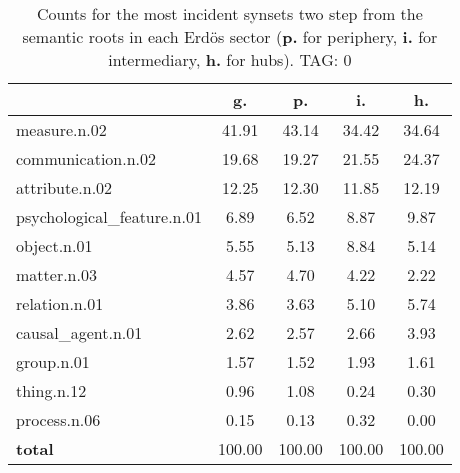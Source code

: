 \begin{table}[h!]
\begin{center}
\begin{tabular}{| l || c | c | c | c |}\hline
 & {\bf g.} & {\bf p.} & {\bf i.} & {\bf h.} \\\hline\hline
measure.n.02 & 41.91  & 43.14  & 34.42  & 34.64 \\\hline
communication.n.02 & 19.68  & 19.27  & 21.55  & 24.37 \\\hline
attribute.n.02 & 12.25  & 12.30  & 11.85  & 12.19 \\\hline
psychological\_feature.n.01 & 6.89  & 6.52  & 8.87  & 9.87 \\\hline
object.n.01 & 5.55  & 5.13  & 8.84  & 5.14 \\\hline
matter.n.03 & 4.57  & 4.70  & 4.22  & 2.22 \\\hline
relation.n.01 & 3.86  & 3.63  & 5.10  & 5.74 \\\hline
causal\_agent.n.01 & 2.62  & 2.57  & 2.66  & 3.93 \\\hline
group.n.01 & 1.57  & 1.52  & 1.93  & 1.61 \\\hline
thing.n.12 & 0.96  & 1.08  & 0.24  & 0.30 \\\hline
process.n.06 & 0.15  & 0.13  & 0.32  & 0.00 \\\hline\hline
{{\bf total}} & 100.00  & 100.00  & 100.00  & 100.00 \\\hline
\end{tabular}
\caption{Counts for the most incident synsets two step from the semantic roots in each Erd\"os sector ({\bf p.} for periphery, {\bf i.} for intermediary, {\bf h.} for hubs). TAG: 0}
\end{center}
\end{table}